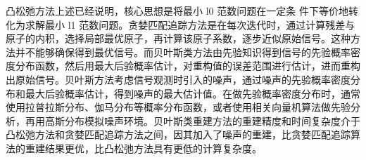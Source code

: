 \begin{table}[htbp]
  \centering
  \caption{传统基于先验知识的压缩感知重建方法及典型的实现算法}
  \label{tab:reconstruction_methods}
\end{table}

凸松弛方法上述已经说明，核心思想是将最小 l0 范数问题在一定条
件下等价地转化为求解最小 l1 范数问题。贪婪匹配追踪方法是在每次迭代时，通过计算残差与原子的内积，选择局部最优原子，再计算该原子系数，逐步近似原始信号。这种方法并不能够确保得到最优信号。而贝叶斯类方法由先验知识得到信号的先验概率密度分布函数，然后用最大后验概率估计，对重构值的误差范围进行估计，进而重构出原始信号。贝叶斯方法考虑信号观测时引入的噪声，通过噪声的先验概率密度分布和最大后验概率估计，得到噪声的最大估计值。在做先验概率密度分布时，通常使用拉普拉斯分布、伽马分布等概率分布函数，或者使用相关向量机算法做先验分析，再用高斯分布模拟噪声环境。贝叶斯类重建方法的重建精度和时间复杂度介于凸松弛方法和贪婪匹配追踪方法之间，因其加入了噪声的重建，比贪婪匹配追踪算法的重建结果更优，比凸松弛方法具有更低的计算复杂度。

